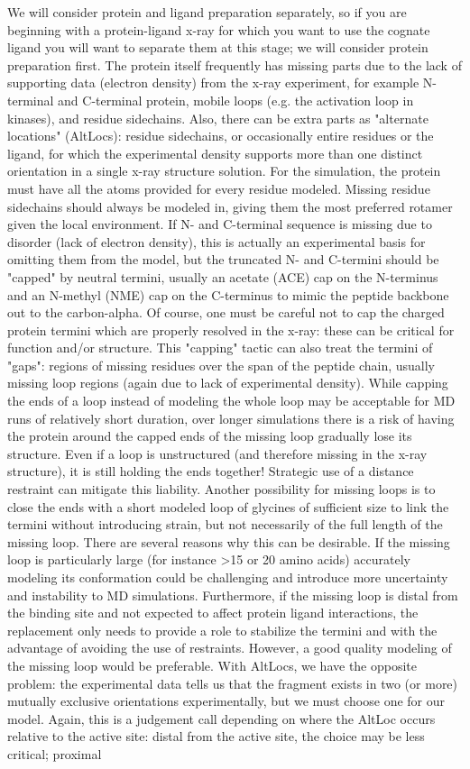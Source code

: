 \documentclass[9pt,bestpractices]{livecoms}
\begin{document}
We will consider protein and ligand preparation separately, so if you are beginning with a protein-ligand x-ray for which you want to use the cognate ligand you will want to separate them at this stage; we will consider protein preparation first. The protein itself frequently has missing parts due to the lack of supporting data (electron density) from the x-ray experiment, for example N-terminal and C-terminal protein, mobile loops (e.g. the activation loop in kinases), and residue sidechains. Also, there can be extra parts as "alternate locations" (AltLocs): residue sidechains, or occasionally entire residues or the ligand, for which the experimental density supports more than one distinct orientation in a single x-ray structure solution. For the simulation, the protein must have all the atoms provided for every residue modeled. Missing residue sidechains should always be modeled in, giving them the most preferred rotamer given the local environment. If N- and C-terminal sequence is missing due to disorder (lack of electron density), this is actually an experimental basis for omitting them from the model, but the truncated N- and C-termini should be "capped" by neutral termini, usually an acetate (ACE) cap on the N-terminus and an N-methyl (NME) cap on the C-terminus to mimic the peptide backbone out to the carbon-alpha. Of course, one must be careful not to cap the charged protein termini which are properly resolved in the x-ray: these can be critical for function and/or structure. This "capping" tactic can also treat the termini of "gaps": regions of missing residues over the span of the peptide chain, usually missing loop regions (again due to lack of experimental density). While capping the ends of a loop instead of modeling the whole loop may be acceptable for MD runs of relatively short duration, over longer simulations there is a risk of having the protein around the capped ends of the missing loop gradually lose its structure. Even if a loop is unstructured (and therefore missing in the x-ray structure), it is still holding the ends together! Strategic use of a distance restraint can mitigate this liability. Another possibility for missing loops is to close the ends with a short modeled loop of glycines of sufficient size to link the termini without introducing strain, but not necessarily of the full length of the missing loop. There are several reasons why this can be desirable. If the missing loop is particularly large (for instance >15 or 20 amino acids) accurately modeling its conformation could be challenging and introduce more uncertainty and instability to MD simulations. Furthermore, if the missing loop is distal from the binding site and not expected to affect protein ligand interactions, the replacement only needs to provide a role to stabilize the termini and with the advantage of avoiding the use of restraints. However, a good quality modeling of the missing loop would be preferable. With AltLocs, we have the opposite problem: the experimental data tells us that the fragment exists in two (or more) mutually exclusive orientations experimentally, but we must choose one for our model. Again, this is a judgement call depending on where the AltLoc occurs relative to the active site: distal from the active site, the choice may be less critical; proximal 
\end{document}
